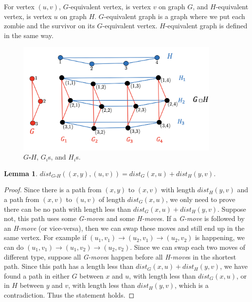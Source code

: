 \documentclass[1p]{elsarticle}
\newtheorem{lemma}[theorem]{Lemma}
\begin{document}
For vertex $(u,v)$, $G$-equivalent vertex, is vertex $v$ on graph $G$, and $H$-equivalent vertex, is vertex $u$ on graph
$H$. $G$-equivalent graph is a graph where we put each zombie and the survivor on its $G$-equivalent vertex.
$H$-equivalent graph is defined in the same way.


\begin{figure}[h!]
	
	\centering
	\includegraphics[width=0.9\textwidth]{fig/cp3.png}
	\caption{$G \square H$, $G_i$s, and $H_i$s.}
	\label{fig:p1}
\end{figure}



\begin{lemma} \label{shortestpathlemma}
	$dist_{G \square H}((x,y),(u,v)) = dist_G(x,u) + dist_H(y,v)$.
\end{lemma}
\begin{proof}
	Since there is a path from $(x,y)$ to $(x,v)$ with length $dist_H(y,v)$ and a path from $(x,v)$ to $(u,v)$ of length
	$dist_G(x,u)$, we only need to prove there can be no path with length less than $dist_G(x,u) + dist_H(y,v)$.
	Suppose not, this path uses some {\it G-move}s and some {\it H-move}s. If a {\it G-move} is followed by an {\it
	H-move} (or vice-versa), then we can swap these moves and still end up in the same vertex. For example if $(u_1,v_1)
	\rightarrow (u_2,v_1) \rightarrow (u_2,v_2)$ is happening, we can do $(u_1,v_1) \rightarrow (u_1,v_2) \rightarrow
	(u_2,v_2)$. Since we can swap each two moves of different type, suppose all {\it G-move}s happen before all {\it
	H-move}s in the shortest path. Since this path has a length less than $dist_G(x,u) + dist_H(y,v)$, we have found a
	path in either $G$ between $x$ and $u$, with length less than $dist_G(x,u)$, or in $H$ between $y$ and $v$, with
	length less than $dist_H(y,v)$, which is a contradiction. Thus the statement holds.
\end{proof}
\end{document}
